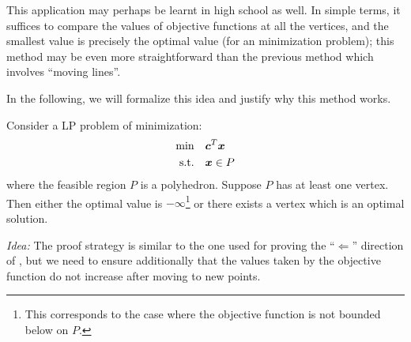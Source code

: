 \begin{enumerate}
This application may perhaps be learnt in high school as well. In simple terms,
it suffices to compare the values of objective functions at all the vertices,
and the smallest value is precisely the optimal value (for an minimization
problem); this method may be even more straightforward than the previous method
which involves ``moving lines''.
\begin{center}
\end{center}
In the following, we will formalize this idea and justify why this method
works.
\begin{theorem}
\label{thm:vertex-optimal}
Consider a LP problem of minimization:
\begin{align*}
\text{min}\quad&\bm{c}^{T}\bm{x} \\
\text{s.t.}\quad&\bm{x}\in P
\end{align*}
where the feasible region \(P\) is a polyhedron.  Suppose \(P\) has at least
one vertex.  Then either the optimal value is \(-\infty\)\footnote{This
corresponds to the case where the objective function is not bounded below on
\(P\).} or there exists a vertex which is an optimal solution.
\end{theorem}
\begin{pf}
\emph{Idea:} The proof strategy is similar to the one used for proving the
``\(\Leftarrow\)'' direction of , but we need to
ensure additionally that the values taken by the objective function do not
increase after moving to new points.


\end{pf}
\end{enumerate}
